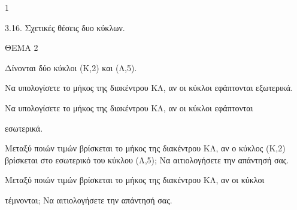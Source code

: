 \begin{ylh}{1}
    \item 3.16. Σχετικές θέσεις δυο κύκλων.
\end{ylh}

ΘΕΜΑ 2

Δίνονται δύο κύκλοι (Κ,2) και (Λ,5).

\begin{alist}
\item Να υπολογίσετε το μήκος της διακέντρου ΚΛ, αν οι κύκλοι εφάπτονται εξωτερικά.


\item Να υπολογίσετε το μήκος της διακέντρου ΚΛ, αν οι κύκλοι εφάπτονται

εσωτερικά. 

\item Μεταξύ ποιών τιμών βρίσκεται το μήκος της διακέντρου ΚΛ, αν ο κύκλος (Κ,2) βρίσκεται στο εσωτερικό του κύκλου (Λ,5); Να αιτιολογήσετε την απάντησή σας.


\item Μεταξύ ποιών τιμών βρίσκεται το μήκος της διακέντρου ΚΛ, αν οι κύκλοι

τέμνονται; Να αιτιολογήσετε την απάντησή σας. 
\end{alist}
